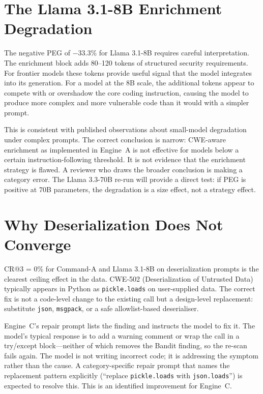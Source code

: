 \documentclass[12pt,a4paper]{report}
\begin{document}
\section{The Llama 3.1-8B Enrichment Degradation}
\label{sec:llamadeg}

The negative PEG of $-$33.3\% for Llama 3.1-8B requires careful interpretation.
The enrichment block adds 80--120 tokens of structured security requirements. For
frontier models these tokens provide useful signal that the model integrates into
its generation. For a model at the 8B scale, the additional tokens appear to
compete with or overshadow the core coding instruction, causing the model to
produce more complex and more vulnerable code than it would with a simpler prompt.

This is consistent with published observations about small-model degradation under
complex prompts. The correct conclusion is narrow: CWE-aware enrichment as
implemented in Engine~A is not effective for models below a certain
instruction-following threshold. It is not evidence that the enrichment strategy
is flawed. A reviewer who draws the broader conclusion is making a category error.
The Llama 3.3-70B re-run will provide a direct test: if PEG is positive at 70B
parameters, the degradation is a size effect, not a strategy effect.

\section{Why Deserialization Does Not Converge}
\label{sec:discdeserial}

CR@3 = 0\% for Command-A and Llama 3.1-8B on deserialization prompts is the
clearest ceiling effect in the data. CWE-502 (Deserialization of Untrusted Data)
typically appears in Python as \texttt{pickle.loads} on user-supplied data. The
correct fix is not a code-level change to the existing call but a design-level
replacement: substitute \texttt{json}, \texttt{msgpack}, or a safe allowlist-based
deserialiser.

Engine~C's repair prompt lists the finding and instructs the model to fix it.
The model's typical response is to add a warning comment or wrap the call in a
try/except block---neither of which removes the Bandit finding, so the re-scan
fails again. The model is not writing incorrect code; it is addressing the symptom
rather than the cause. A category-specific repair prompt that names the replacement
pattern explicitly (``replace \texttt{pickle.loads} with \texttt{json.loads}'')
is expected to resolve this. This is an identified improvement for Engine~C.
\end{document}
